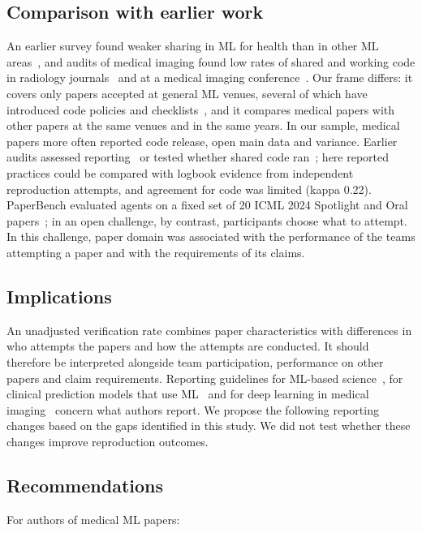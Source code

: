 \documentclass[11pt]{article}
\begin{document}
\subsection*{Comparison with earlier work}
An earlier survey found weaker sharing in ML for health than in other ML areas~\cite{r2}, and audits of medical imaging found low rates of shared and working code in radiology journals~\cite{r3} and at a medical imaging conference~\cite{r4}. Our frame differs: it covers only papers accepted at general ML venues, several of which have introduced code policies and checklists~\cite{r6}, and it compares medical papers with other papers at the same venues and in the same years. In our sample, medical papers more often reported code release, open main data and variance. Earlier audits assessed reporting~\cite{r5} or tested whether shared code ran~\cite{r3,r4}; here reported practices could be compared with logbook evidence from independent reproduction attempts, and agreement for code was limited (kappa 0.22). PaperBench evaluated agents on a fixed set of 20 ICML 2024 Spotlight and Oral papers~\cite{r8}; in an open challenge, by contrast, participants choose what to attempt. In this challenge, paper domain was associated with the performance of the teams attempting a paper and with the requirements of its claims.

\subsection*{Implications}
An unadjusted verification rate combines paper characteristics with differences in who attempts the papers and how the attempts are conducted. It should therefore be interpreted alongside team participation, performance on other papers and claim requirements. Reporting guidelines for ML-based science~\cite{r15}, for clinical prediction models that use ML~\cite{r16} and for deep learning in medical imaging~\cite{r17} concern what authors report. We propose the following reporting changes based on the gaps identified in this study. We did not test whether these changes improve reproduction outcomes.

\subsection*{Recommendations}
For authors of medical ML papers:
\end{document}
